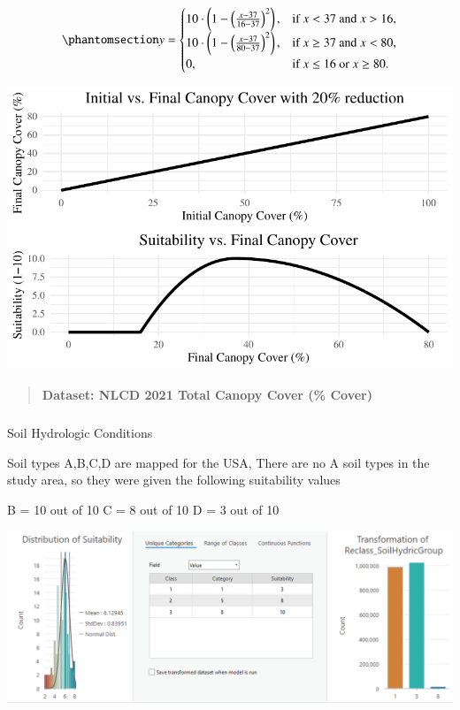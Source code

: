 \documentclass[
  number]{elsarticle}
\makeatletter
\let\oldsubparagraph\subparagraph
\renewcommand{\subparagraph}{
    \@ifstar
      \xxxSubParagraphStar
      \xxxSubParagraphNoStar
  }
\newcommand{\xxxSubParagraphStar}[1]{\oldsubparagraph*{#1}\mbox{}}
\newcommand{\xxxSubParagraphNoStar}[1]{\oldsubparagraph{#1}\mbox{}}
\makeatother
\begin{document}
\begin{equation}\phantomsection\label{eq-cc-suitability}{y =\begin{cases} 10 \cdot \left(1 - \left(\frac{x - 37}{16 - 37}\right)^2\right),& \text{if } x < 37 \text{ and } x > 16, \\10 \cdot \left(1 - \left(\frac{x - 37}{80 - 37}\right)^2\right), & \text{if } x \geq 37 \text{ and } x < 80, \\0, & \text{if } x \leq 16 \text{ or } x \geq 80.\end{cases}}\end{equation}

\includegraphics{Thinning_Manuscript_files/figure-pdf/unnamed-chunk-1-1.pdf}

\begin{quote}
\textbf{Dataset: NLCD 2021 Total Canopy Cover (\% Cover)}
\end{quote}

\subparagraph{Soil Hydrologic
Conditions}\label{soil-hydrologic-conditions}

Soil types A,B,C,D are mapped for the USA, There are no A soil types in
the study area, so they were given the following suitability values

B = 10 out of 10 C = 8 out of 10 D = 3 out of 10

\includegraphics{images/SoilHydrologicGroup_suitability.PNG}
\end{document}
